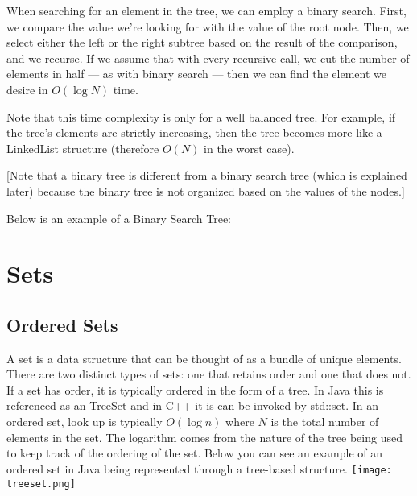 When searching for an element in the tree, we can employ a binary search. First, we compare the value we're looking for with the value of the root node. Then, we select either the left or the right subtree based on the result of the comparison, and we recurse. If we assume that with every recursive call, we cut the number of elements in half --- as with binary search --- then we can find the element we desire in $O(\log{N})$ time.

Note that this time complexity is only for a well balanced tree. For example, if the tree's elements are strictly increasing, then the tree becomes more like a LinkedList structure (therefore $O(N)$ in the worst case).

[Note that a binary tree is different from a binary search tree (which is explained later) because the binary tree is not organized based on the values of the nodes.]

Below is an example of a Binary Search Tree:
\begin{center}
\end{center}


\section{Sets}
\subsection{Ordered Sets}
A set is a data structure that can be thought of as a bundle of unique elements. There are two distinct types of sets: one that retains order and one that does not. If a set has order, it is typically ordered in the form of a tree. In Java this is referenced as an TreeSet and in C++ it is can be invoked by std::set. In an ordered set, look up is typically $O(\log n)$ where $N$ is the total number of elements in the set. The logarithm comes from the nature of the tree being used to keep track of the ordering of the set. Below you can see an example of an ordered set in Java being represented through a tree-based structure.
\texttt{[image: treeset.png]}
